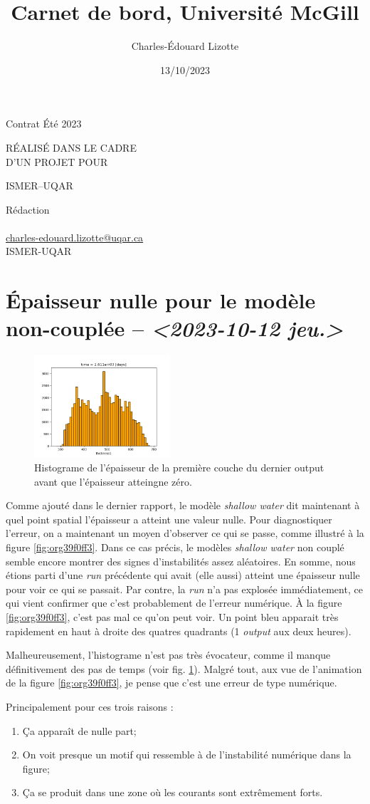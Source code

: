 \documentclass[10pt]{article}
\author{Charles-Édouard Lizotte}
\date{13/10/2023}
\title{Carnet de bord, Université McGill}
\makeatletter
\numberwithin{equation}{section}
\newcommand{\mytitlepage}{
\begin{titlepage}
\begin{center}
{\Large Contrat Été 2023 \par}
\vspace{2cm}
{\Large \MakeUppercase{\thetitle} \par}
\vspace{2cm}
RÉALISÉ DANS LE CADRE\\ D'UN PROJET POUR \par
\vspace{2cm}
{\Large ISMER--UQAR \par}
\vspace{2cm}
{\thedate}
\end{center}
\vfill
Rédaction \\
{\theauthor}\\
\url{charles-edouard.lizotte@uqar.ca}\\
ISMER-UQAR
\end{titlepage}
}
\makeatother
\begin{document}
\mytitlepage
\tableofcontents\newpage

\section{Épaisseur nulle pour le modèle non-couplée -- \textit{<2023-10-12 jeu.>}}
\label{sec:orgc93a424}

\begin{figure}\vspace{-\baselineskip} \centering
\centering
\includegraphics[width=0.45\textwidth]{figures/debuggage/2023_10_08_thickness1_histo.png}
\caption{\label{fig:org50bfb39}Histograme de l'épaisseur de la première couche du dernier output avant que l'épaisseur atteingne zéro.}
\end{figure}


Comme ajouté dans le dernier rapport, le modèle \emph{shallow water} dit maintenant à quel point spatial l'épaisseur a atteint une valeur nulle.
Pour diagnostiquer l'erreur, on a maintenant un moyen d'observer ce qui se passe, comme illustré à la figure \ref{fig:org39f0ff3}.
Dans ce cas précis, le modèles \emph{shallow water} non couplé semble encore montrer des signes d'instabilités assez aléatoires.
En somme, nous étions parti d'une \emph{run} précédente qui avait (elle aussi) atteint une épaisseur nulle pour voir ce qui se passait.
Par contre, la \emph{run} n'a pas explosée immédiatement, ce qui vient confirmer que c'est probablement de l'erreur numérique.
À la figure \ref{fig:org39f0ff3}, c'est pas mal ce qu'on peut voir.
Un point bleu apparait très rapidement en haut à droite des quatres quadrants (1 \emph{output} aux deux heures). \bigskip

Malheureusement, l'histograme n'est pas très évocateur, comme il manque définitivement des pas de temps (voir fig. \ref{fig:org50bfb39}).
Malgré tout, aux vue de l'animation de la figure \ref{fig:org39f0ff3}, je pense que c'est une erreur de type numérique.\bigskip

Principalement pour ces trois raisons : 
\begin{enumerate}
\item Ça apparaît de nulle part;
\item On voit presque un motif qui ressemble à de l'instabilité numérique dans la figure;
\item Ça se produit dans une zone où les courants sont extrêmement forts.
\end{enumerate}
\end{document}
